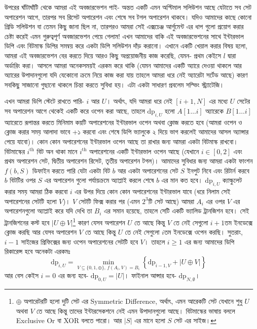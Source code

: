 \begin{solution}
উপরের ঘাঁটাঘাঁটি থেকে আমরা এই অবজারভেশন পাই- অন্তত একটি এমন অপ্টিমাল সলিউশন আছে যেটাতে সব সেট অপারেশন আগে, তারপর সব রিসেট অপারেশন এবং শেষে সব টগল অপারেশন থাকবে। যদিও আমাদের কাছে কোনো গ্রিডি সলিউশন বা তেমন কিছু জানা ছিল না, তারপরও আমরা সেই এক্সচেঞ্জ আর্গুমেন্ট এর ধাপ গুলো প্রয়োগ করার চেষ্টা করেই এমন গুরুত্বপূর্ণ অবজারভেশন পেয়ে গেলাম! এখন আমাদের বাকি এই অবজারভেশনের সাথে ইন্টারভাল ডিপি এবং বিটমাস্ক ডিপির সমন্বয় করে একটা ডিপি সলিউশন দাঁড় করানো। এখানে একটি খেয়াল করার বিষয় হলো, আমরা এই অবজারভেশন বের করতে দিয়ে আরও কিছু অপ্রয়োজনীয় কাজ করেছি, যেমন- প্রথম কেইসে $l$ দ্বারা অর্ডারিং করা। আসলে আমরা অনেকসময়ই এরকম করে থাকি (যেমন আমাদের একটি অ্যারে দেওয়া থাকলে আর অ্যারের উপাদানগুলো যদি যেকোনো ক্রমে নিয়ে কাজ করা যায় তাহলে আমরা ধরে নেই অ্যারেটা সর্টেড আছে) কারণ সবকিছু সাজানো গুছানো থাকলে চিন্তা করতে সুবিধা হয়। এটা একটা সাধারণ প্রবলেম সল্ভিং স্ট্র্যাটেজি।

এখন আমরা ডিপি স্টেটে রাখতে পারি- $i$ আর $U$। অর্থাৎ, যদি আমরা ধরে নেই $[i+1, N]$ এর মধ্যে $U$ সেটের সব অপারেশন আগে থেকেই একটি করে ওপেন করা আছে, তাহলে $\text{dp}_{i, U}$ হলো $A[1 \ldots i]$ অ্যারেকে $B[1 \ldots i]$ অ্যারেতে রূপান্তর করতে মিনিমাম কয়টি অপারেশনের ইন্টারভাল ওপেন অথবা ক্লোজ করতে হবে (আমরা ওপেন ও ক্লোজ করার সময় আলাদা ভাবে +১ করবো এবং শেষে ডিপি ভ্যালুকে ২ দিয়ে ভাগ করলেই আমাদের আসল অ্যান্সার পেয়ে যাবো)। কোন কোন অপারেশনের ইন্টারভাল ওপেন আছে তা রাখার জন্য আমরা একটা বিটমাস্ক রাখবো। বিটমাস্কের $i^{\text{th}}$ বিট অন থাকা মানে $i^{\text{th}}$ অপারেশনের একটি ইন্টারভাল ওপেন আছে (যেখানে $i \in [0, 2]$ এবং প্রথম অপারেশন সেট, দ্বিতীয় অপারেশন রিসেট, তৃতীয় অপারেশন টগল)। আমাদের সুবিধার জন্য আমরা একটা ফাংশন $f(b, S)$ ডিফাইন করতে পারি যেটা একটা বিট $b$ আর একটা অপারেশনের সেট $S$ ইনপুট নিবে এবং রিটার্ন করবে $b$ বিটটির ওপর $S$ এর অপারেশন গুলো পর্যায়ক্রমে অ্যাপ্লাই করলে শেষে $b$ এর মান কত হবে। $\text{dp}_{i, U}$ ক্যাল্কুলেট করার সময় আমরা ঠিক করবো $i$ এর উপর দিয়ে কোন কোন অপারেশনের ইন্টারভাল যাবে (ধরে নিলাম সেই অপারেশনের সেটটি হলো $V$)। $V$ সেটটি ফিক্স করার পর (এমন $2^{3}$টি সেট আছে) আমরা $A_i$ এর ওপর $V$ এর অপারেশনগুলো অ্যাপ্লাই করে যদি দেখি তা $B_i$ এর সমান হয়েছে, তাহলে সেটি একটি ভ্যালিড ট্রানজিশন হবে। সেই ট্রানজিশনের কস্ট হবে $|U \oplus V|$\footnote{$\oplus$ অপারেটরটি হলো দুটি সেট এর Symmetric Difference, অর্থাৎ, এমন আরেকটি সেট যেখানে শুধু $U$ অথবা $V$ তে আছে কিন্তু তাদের ইন্টারসেকশনে নেই এমন উপাদানগুলো আছে। বিটমাস্কের ভাষায় বললে Exclusive Or বা XOR বলতে পারো। আর $|S|$ এর মানে হলো $S$ সেট এর সাইজ।} কারণ যেসব অপারেশন $U$ তে আছে কিন্তু $V$ তে নেই সেগুলো $i+1$তম ইনডেক্সে ক্লোজ করছি আর যেসব অপারেশন $V$ তে আছে কিন্তু $U$ তে নেই সেগুলো $i$তম ইনডেক্সে ওপেন করছি। সুতরাং, $i-1$ সাইজের প্রিফিক্সের জন্য ওপেন অপারেশনের সেটটি হবে $V$। তাহলে $i \ge 1$ এর জন্য আমাদের ডিপি রিকারেন্স হবে অনেকটা এরকমঃ
\begin{equation*}
\text{dp}_{i,U} = \min_{V \subseteq \{0, 1, \oplus\},\, f(A_i, V) = B_i} \left \{ \text{dp}_{i-1, V} + |U \oplus V| \right \}
\end{equation*}
আর বেস কেইস $i=0$ এর জন্য হবে- $\text{dp}_{0, U} = |U|$। ফাইনাল আন্সার হবে- $\text{dp}_{N,\emptyset}$।


\end{solution}
